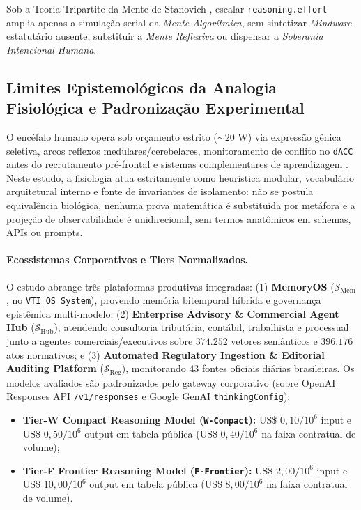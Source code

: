\documentclass[10pt,twocolumn]{article}
\begin{document}
Sob a Teoria Tripartite da Mente de Stanovich \cite{stanovich2009what,stanovich2011rationality,stanovich2016rationality,evans2013dual,deneys2023advancing}, escalar \texttt{reasoning.effort} amplia apenas a simula\c{c}\~ao serial da \emph{Mente Algor\'itmica}, sem sintetizar \emph{Mindware} estatut\'ario ausente, substituir a \emph{Mente Reflexiva} ou dispensar a \emph{Soberania Intencional Humana}.

\subsection{Limites Epistemol\'ogicos da Analogia Fisiol\'ogica e Padroniza\c{c}\~ao Experimental}

O enc\'efalo humano opera sob or\c{c}amento estrito ($\sim 20\text{ W}$) via express\~ao g\^enica seletiva, arcos reflexos medulares/cerebelares, monitoramento de conflito no \texttt{dACC} antes do recrutamento pr\'e-frontal \cite{attwell2001energy,botvinick2001conflict,baddeley2000episodic} e sistemas complementares de aprendizagem \cite{mcclelland1995why,gutierrez2024hipporag}. Neste estudo, a fisiologia atua estritamente como heur\'istica modular, vocabul\'ario arquitetural interno e fonte de invariantes de isolamento: n\~ao se postula equival\^encia biol\'ogica, nenhuma prova matem\'atica \'e substitu\'ida por met\'afora e a proje\c{c}\~ao de observabilidade \'e unidirecional, sem termos anat\^omicos em schemas, APIs ou prompts.

\paragraph{Ecossistemas Corporativos e Tiers Normalizados.}
O estudo abrange tr\^es plataformas produtivas integradas: (1) \textbf{MemoryOS} ($\mathcal{S}_{\mathrm{Mem}}$, no \texttt{VTI OS System}), provendo mem\'oria bitemporal h\'ibrida e governan\c{c}a epist\^emica multi-modelo; (2) \textbf{Enterprise Advisory \& Commercial Agent Hub} ($\mathcal{S}_{\mathrm{Hub}}$), atendendo consultoria tribut\'aria, cont\'abil, trabalhista e processual junto a agentes comerciais/executivos sobre $374.252$ vetores sem\^anticos e $396.176$ atos normativos; e (3) \textbf{Automated Regulatory Ingestion \& Editorial Auditing Platform} ($\mathcal{S}_{\mathrm{Reg}}$), monitorando $43$ fontes oficiais di\'arias brasileiras. Os modelos avaliados s\~ao padronizados pelo gateway corporativo (sobre OpenAI Responses API \texttt{/v1/responses} e Google GenAI \texttt{thinkingConfig}):
\begin{itemize}[leftmargin=*,nosep]
  \item \textbf{Tier-W Compact Reasoning Model (\texttt{W-Compact}):} US\$ $0,10 / 10^6$ input e US\$ $0,50 / 10^6$ output em tabela p\'ublica (US\$ $0,40 / 10^6$ na faixa contratual de volume);
  \item \textbf{Tier-F Frontier Reasoning Model (\texttt{F-Frontier}):} US\$ $2,00 / 10^6$ input e US\$ $10,00 / 10^6$ output em tabela p\'ublica (US\$ $8,00 / 10^6$ na faixa contratual de volume).
\end{itemize}
\end{document}
